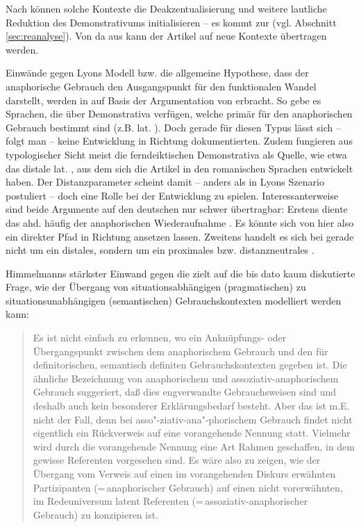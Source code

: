 \noindent
Nach \textcite[332]{Lyons1999} können solche Kontexte die Deakzentualisierung und weitere lautliche Reduktion des Demonstrativums   initialisieren -- es kommt zur  (vgl. Abschnitt \ref{sec:reanalyse}). Von da aus kann der Artikel auf neue Kontexte übertragen werden. 

Einwände gegen Lyons Modell bzw. die allgemeine Hypothese, dass der anaphorische   Gebrauch den Ausgangspunkt für den funktionalen Wandel darstellt, werden in \textcite[527]{deMulder2011} auf Basis der Argumentation von \textcite[96--98]{Himmelmann1997} erbracht. So gebe es Sprachen, die über Demonstrativa  verfügen, welche primär für den anaphorischen  Gebrauch bestimmt sind (z.B. lat. ). Doch gerade für diesen Typus lässt sich -- folgt man \textcite[98]{Himmelmann1997} -- keine Entwicklung in Richtung  dokumentierten.  Zudem fungieren aus typologischer Sicht meist die ferndeiktischen Demonstrativa  als Quelle, wie etwa das distale lat. , aus dem sich die Artikel in den romanischen Sprachen entwickelt haben. Der Distanzparameter scheint damit -- anders als in Lyons Szenario postuliert -- doch eine Rolle bei der Entwicklung zu spielen. Interessanterweise sind beide Argumente auf den deutschen  nur schwer übertragbar: Erstens diente das ahd.  häufig der anaphorischen  Wiederaufnahme  \parencite[z.B.][]{Jager1917, Jager1918,Oubouzar1992,Leiss2000}. Es könnte sich von hier also ein direkter Pfad in Richtung  ansetzen lassen. Zweitens handelt es sich bei  gerade nicht um ein distales, sondern um ein proximales bzw. distanzneutrales  . 


Himmelmanns stärkster Einwand gegen die  zielt auf die bis dato kaum diskutierte Frage, wie der Übergang von situationsabhängigen  (pragmatischen) zu situationsunabhängigen (semantischen) Gebrauchskontexten  modelliert werden kann: \blockcquote[94]{Himmelmann1997}{Es ist nicht einfach zu erkennen, wo ein Anknüpfungs- oder Übergangspunkt zwischen dem anaphorischem  Gebrauch und den für  definitorischen, semantisch definiten Gebrauchskontexten  gegeben ist. Die ähnliche Bezeichnung von anaphorischem  und assoziativ-anaphorischem  Gebrauch suggeriert, daß dies engverwandte Gebrauchsweisen sind und deshalb auch kein besonderer Erklärungsbedarf besteht. Aber das ist m.E. nicht der Fall, denn bei asso"-ziativ-ana"-phorischem Gebrauch findet nicht eigentlich ein Rückverweis auf eine
vorangehende Nennung statt. Vielmehr wird durch die vorangehende Nennung eine Art Rahmen geschaffen, in dem gewisse Referenten vorgesehen sind. 
Es wäre also zu zeigen, wie der Übergang vom Verweis auf einen im vorangehenden Diskurs erwähnten Partizipanten (=\,anaphorischer Gebrauch)  auf einen
nicht vorerwähnten, im Redeuniversum latent  Referenten (=\,assoziativ-anaphorischer Gebrauch) zu konzipieren ist.}

